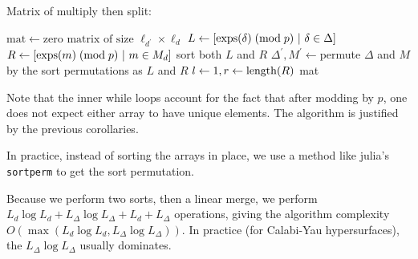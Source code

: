 \begin{algorithm}[H]
\caption{Matrix of multiply then split: \merge}
\label{alg:theta:merge}
$\text{mat} \gets \text{zero matrix of size } \ell_{d^\prime} \times \ell_d $\;
$L \gets [\operatorname{exps}(\delta) \; (\text{mod} \; p) ~|~ \delta \in \Delta]$\;
$R \gets [\operatorname{exps}(m) \; (\text{mod} \; p) ~|~ m \in M_{d}]$\;
sort both  \(L\) and \(R\) \;
\(\Delta^{\prime}, M^{\prime} \gets \)permute \(\Delta\) and \(M\) by the sort permutations as \(L\) and \(R\)\;
\(l \gets 1, r \gets \operatorname{length}(R)\)\;
\Return mat
\end{algorithm}

Note that the inner while loops account for the fact that
after modding by \(p\), one does not expect 
either array to have unique elements.
The algorithm is justified by the previous corollaries.

In practice, instead of sorting the arrays in place, 
we use a method like julia's \texttt{sortperm}
to get the sort permutation.

Because we perform two sorts, then a linear merge, 
we perform 
$L_{d} \log L_{d} + L_{\Delta} \log L_{\Delta} + L_{d} + L_{\Delta}$ operations, 
giving the algorithm complexity 
$O(\max(L_{d} \log L_{d}, L_{\Delta} \log L_{\Delta}))$.
In practice (for Calabi-Yau hypersurfaces), 
the $L_{\Delta} \log L_{\Delta}$ usually dominates.


